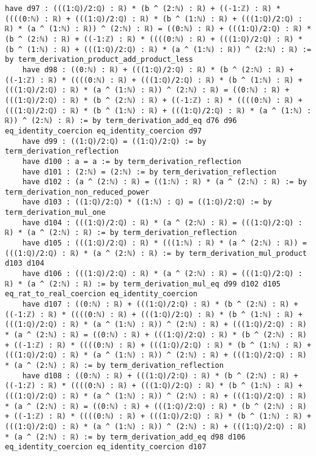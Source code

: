 \documentclass{article}
\begin{document}
\begin{tcolorbox}[colback=white!10, width=\linewidth]
\begin{lstlisting}[language=Lean4]
    have d97 : (((1:ℚ)/2:ℚ) : ℝ) * (b ^ (2:ℕ) : ℝ) + ((-1:ℤ) : ℝ) * ((((0:ℕ) : ℝ) + (((1:ℚ)/2:ℚ) : ℝ) * (b ^ (1:ℕ) : ℝ) + (((1:ℚ)/2:ℚ) : ℝ) * (a ^ (1:ℕ) : ℝ)) ^ (2:ℕ) : ℝ) = ((0:ℕ) : ℝ) + (((1:ℚ)/2:ℚ) : ℝ) * (b ^ (2:ℕ) : ℝ) + ((-1:ℤ) : ℝ) * ((((0:ℕ) : ℝ) + (((1:ℚ)/2:ℚ) : ℝ) * (b ^ (1:ℕ) : ℝ) + (((1:ℚ)/2:ℚ) : ℝ) * (a ^ (1:ℕ) : ℝ)) ^ (2:ℕ) : ℝ) := by term_derivation_product_add_product_less
    have d98 : ((0:ℕ) : ℝ) + (((1:ℚ)/2:ℚ) : ℝ) * (b ^ (2:ℕ) : ℝ) + ((-1:ℤ) : ℝ) * ((((0:ℕ) : ℝ) + (((1:ℚ)/2:ℚ) : ℝ) * (b ^ (1:ℕ) : ℝ) + (((1:ℚ)/2:ℚ) : ℝ) * (a ^ (1:ℕ) : ℝ)) ^ (2:ℕ) : ℝ) = ((0:ℕ) : ℝ) + (((1:ℚ)/2:ℚ) : ℝ) * (b ^ (2:ℕ) : ℝ) + ((-1:ℤ) : ℝ) * ((((0:ℕ) : ℝ) + (((1:ℚ)/2:ℚ) : ℝ) * (b ^ (1:ℕ) : ℝ) + (((1:ℚ)/2:ℚ) : ℝ) * (a ^ (1:ℕ) : ℝ)) ^ (2:ℕ) : ℝ) := by term_derivation_add_eq d76 d96 eq_identity_coercion eq_identity_coercion d97
    have d99 : ((1:ℚ)/2:ℚ) = ((1:ℚ)/2:ℚ) := by term_derivation_reflection
    have d100 : a = a := by term_derivation_reflection
    have d101 : (2:ℕ) = (2:ℕ) := by term_derivation_reflection
    have d102 : (a ^ (2:ℕ) : ℝ) = ((1:ℕ) : ℝ) * (a ^ (2:ℕ) : ℝ) := by term_derivation_non_reduced_power
    have d103 : ((1:ℚ)/2:ℚ) * ((1:ℕ) : ℚ) = ((1:ℚ)/2:ℚ) := by term_derivation_mul_one
    have d104 : (((1:ℚ)/2:ℚ) : ℝ) * (a ^ (2:ℕ) : ℝ) = (((1:ℚ)/2:ℚ) : ℝ) * (a ^ (2:ℕ) : ℝ) := by term_derivation_reflection
    have d105 : (((1:ℚ)/2:ℚ) : ℝ) * (((1:ℕ) : ℝ) * (a ^ (2:ℕ) : ℝ)) = (((1:ℚ)/2:ℚ) : ℝ) * (a ^ (2:ℕ) : ℝ) := by term_derivation_mul_product d103 d104
    have d106 : (((1:ℚ)/2:ℚ) : ℝ) * (a ^ (2:ℕ) : ℝ) = (((1:ℚ)/2:ℚ) : ℝ) * (a ^ (2:ℕ) : ℝ) := by term_derivation_mul_eq d99 d102 d105 eq_rat_to_real_coercion eq_identity_coercion
    have d107 : ((0:ℕ) : ℝ) + (((1:ℚ)/2:ℚ) : ℝ) * (b ^ (2:ℕ) : ℝ) + ((-1:ℤ) : ℝ) * ((((0:ℕ) : ℝ) + (((1:ℚ)/2:ℚ) : ℝ) * (b ^ (1:ℕ) : ℝ) + (((1:ℚ)/2:ℚ) : ℝ) * (a ^ (1:ℕ) : ℝ)) ^ (2:ℕ) : ℝ) + (((1:ℚ)/2:ℚ) : ℝ) * (a ^ (2:ℕ) : ℝ) = ((0:ℕ) : ℝ) + (((1:ℚ)/2:ℚ) : ℝ) * (b ^ (2:ℕ) : ℝ) + ((-1:ℤ) : ℝ) * ((((0:ℕ) : ℝ) + (((1:ℚ)/2:ℚ) : ℝ) * (b ^ (1:ℕ) : ℝ) + (((1:ℚ)/2:ℚ) : ℝ) * (a ^ (1:ℕ) : ℝ)) ^ (2:ℕ) : ℝ) + (((1:ℚ)/2:ℚ) : ℝ) * (a ^ (2:ℕ) : ℝ) := by term_derivation_reflection
    have d108 : ((0:ℕ) : ℝ) + (((1:ℚ)/2:ℚ) : ℝ) * (b ^ (2:ℕ) : ℝ) + ((-1:ℤ) : ℝ) * ((((0:ℕ) : ℝ) + (((1:ℚ)/2:ℚ) : ℝ) * (b ^ (1:ℕ) : ℝ) + (((1:ℚ)/2:ℚ) : ℝ) * (a ^ (1:ℕ) : ℝ)) ^ (2:ℕ) : ℝ) + (((1:ℚ)/2:ℚ) : ℝ) * (a ^ (2:ℕ) : ℝ) = ((0:ℕ) : ℝ) + (((1:ℚ)/2:ℚ) : ℝ) * (b ^ (2:ℕ) : ℝ) + ((-1:ℤ) : ℝ) * ((((0:ℕ) : ℝ) + (((1:ℚ)/2:ℚ) : ℝ) * (b ^ (1:ℕ) : ℝ) + (((1:ℚ)/2:ℚ) : ℝ) * (a ^ (1:ℕ) : ℝ)) ^ (2:ℕ) : ℝ) + (((1:ℚ)/2:ℚ) : ℝ) * (a ^ (2:ℕ) : ℝ) := by term_derivation_add_eq d98 d106 eq_identity_coercion eq_identity_coercion d107

\end{lstlisting}
\end{tcolorbox}
\end{document}

